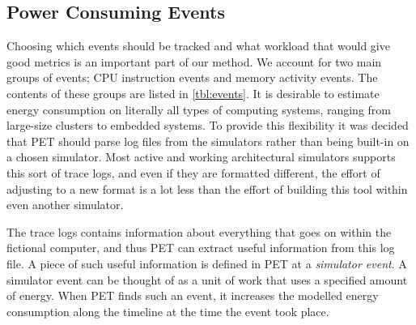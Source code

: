 \subsection{Power Consuming Events}
\label{subsec:powerevents}

Choosing which events should be tracked and what workload that would give good
metrics is an important part of our method. We account for two main groups of
events; CPU instruction events and memory activity events. The contents of these
groups are listed in \autoref{tbl:events}. It is desirable to estimate energy
consumption on literally all types of computing systems, ranging from large-size
clusters to embedded systems. To provide this flexibility it was decided that
PET should parse log files from the simulators rather than being built-in on a
chosen simulator. Most active and working architectural simulators supports this
sort of trace logs, and even if they are formatted different, the effort of
adjusting to a new format is a lot less than the effort of building this tool
within even another simulator.

The trace logs contains information about everything that goes on within the
fictional computer, and thus PET can extract useful information from this log
file. A piece of such useful information is defined in PET at a \emph{simulator
event}. A simulator event can be thought of as a unit of work that uses a
specified amount of energy. When PET finds such an event, it increases the
modelled energy consumption along the timeline at the time the event took place.

